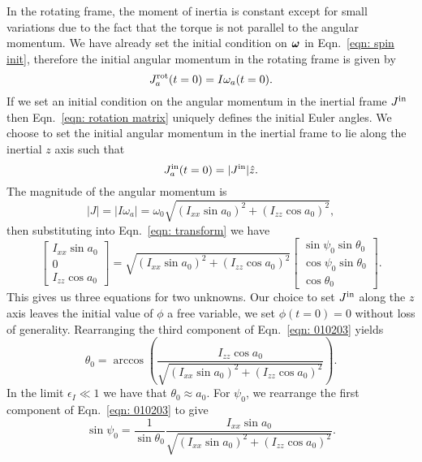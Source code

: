 \documentclass[../full_thesis/full_thesis.tex]{subfiles}
\begin{document}
In the rotating frame, the moment of inertia is constant except for small variations
due to the fact that the torque is not parallel to the angular momentum.
We have already set the initial condition on $\boldsymbol{\omega}$ in Eqn.~\eqref{eqn:
spin init}, therefore the initial angular momentum in the rotating frame is given by
\begin{equation}
  J^{\textrm{rot}}_a(t=0) = I \omega_a(t=0).
\end{equation}
If we set an initial condition on the angular momentum in the inertial frame
$J^{\textrm{in}}$ then Eqn.~\eqref{eqn: rotation matrix} uniquely defines the initial
Euler angles. We choose to set the initial angular momentum in the inertial
frame to lie along the inertial $z$ axis such that
\begin{equation}
  J^{\textrm{in}}_a(t=0) = |J^{\textrm{in}}| \hat{z}.
\end{equation}
The magnitude of the angular momentum is
\begin{equation}
|J| = |I \omega_{a}|=\omega_{0}\sqrt{(I_{xx}\sin a_{0})^{2} + (I_{zz}\cos a_{0})^{2}},
\end{equation}
then substituting into Eqn.~\eqref{eqn: transform} we have
\begin{equation}
\left[ \begin{array}{c}
I_{xx}\sin a_{0} \\
0 \\
I_{zz} \cos a_{0}
\end{array}\right] =
\sqrt{(I_{xx}\sin a_{0})^{2} + (I_{zz}\cos a_{0})^{2}}
\left[ \begin{array}{c}
\sin \psi_{0} \sin \theta_{0} \\
\cos \psi_{0} \sin \theta_{0} \\
\cos \theta_{0}
\end{array}\right].
\label{eqn: 010203}
\end{equation}
This gives us three equations for two unknowns. Our choice to set $J^{\textrm{in}}$ along
the $z$ axis leaves the initial value of $\phi$ a free variable,
we set $\phi(t=0) = 0$ without loss of generality.
Rearranging the third component of Eqn.~\eqref{eqn: 010203} yields
\begin{equation}
\theta_{0} = \arccos\left(\frac{I_{zz}\cos a_{0}}{ \sqrt{(I_{xx}\sin
        a_{0})^{2} + (I_{zz}\cos a_{0})^{2}}} \right).
\label{eqn: theta init}
\end{equation}
In the limit $\epsilon_{I} \ll 1$ we have that $\theta_{0} \approx a_{0}$.
For $\psi_0$, we rearrange the first component of Eqn.~\eqref{eqn: 010203} to
give
\begin{equation}
\sin\psi_{0} =\frac{1}{ \sin\theta_{0}}
\frac{ I_{xx}\sin a_{0}}{\sqrt{(I_{xx}\sin a_{0})^{2} + (I_{zz}\cos a_{0})^{2}}}.
\label{eqn: 8283}
\end{equation}
\end{document}
